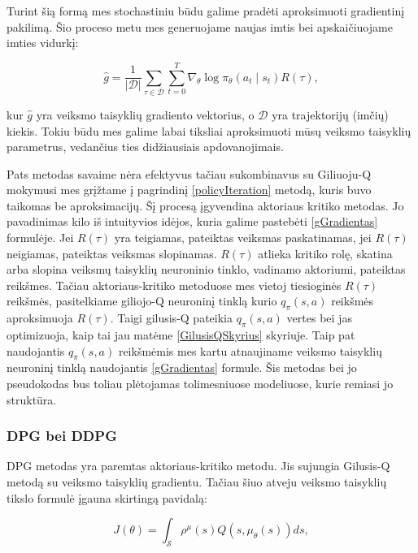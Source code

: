 \documentclass[a4paper, 12pt]{article}
\begin{document}
Turint šią formą mes stochastiniu būdu galime pradėti aproksimuoti gradientinį pakilimą. Šio proceso metu mes generuojame naujas imtis bei apskaičiuojame imties vidurkį:

\begin{equation}
\label{gGradientas}
\hat{g}=\frac{1}{|\mathcal{D}|} \sum_{\tau \in \mathcal{D}} \sum_{t=0}^{T} \nabla_{\theta} \log \pi_{\theta}\left(a_{t} \mid s_{t}\right) R(\tau),
\end{equation}

kur $\hat{g}$ yra veiksmo taisyklių gradiento vektorius, o $\mathcal{D}$ yra trajektorijų (imčių) kiekis. Tokiu būdu mes galime labai tiksliai aproksimuoti mūsų veiksmo taisyklių parametrus, vedančius ties didžiausiais apdovanojimais. 

Pats metodas savaime nėra efektyvus tačiau sukombinavus su Giliuoju-Q mokymusi mes grįžtame į pagrindinį \ref{policyIteration} metodą, kuris buvo taikomas be aproksimacijų. Šį procesą įgyvendina aktoriaus kritiko metodas. Jo pavadinimas kilo iš intuityvios idėjos, kuria galime pastebėti \ref{gGradientas} formulėje. Jei $R(\tau)$ yra teigiamas, pateiktas veiksmas paskatinamas, jei $R(\tau)$ neigiamas, pateiktas veiksmas slopinamas. $R(\tau)$ atlieka kritiko rolę, skatina arba slopina veiksmų taisyklių neuroninio tinklo, vadinamo aktoriumi, pateiktas reikšmes. Tačiau aktoriaus-kritiko metoduose mes vietoj tiesioginės $R(\tau)$ reikšmės, pasitelkiame giliojo-Q neuroninį tinklą kurio $q_{\pi}(s, a)$ reikšmės aproksimuoja $R(\tau)$. Taigi gilusis-Q pateikia $q_{\pi}(s, a)$ vertes bei jas optimizuoja, kaip tai jau matėme \ref{GilusisQSkyrius} skyriuje. Taip pat naudojantis $q_{\pi}(s, a)$ reikšmėmis mes kartu atnaujiname veiksmo taisyklių neuroninį tinklą naudojantis \ref{gGradientas} formule. Šis metodas bei jo pseudokodas bus toliau plėtojamas tolimesniuose modeliuose, kurie remiasi jo struktūra.

\subsubsection{DPG bei DDPG}

DPG\cite{DPG} metodas yra paremtas aktoriaus-kritiko metodu. Jis sujungia Gilusis-Q metodą su veiksmo taisyklių gradientu. Tačiau šiuo atveju veiksmo taisyklių tikslo formulė įgauna skirtingą pavidalą:

\begin{equation}
J(\theta)=\int_{\mathcal{S}} \rho^{\mu}(s) Q\left(s, \mu_{\theta}(s)\right) d s,
\label{netoksKeistasGradientas}
\end{equation}
\end{document}
